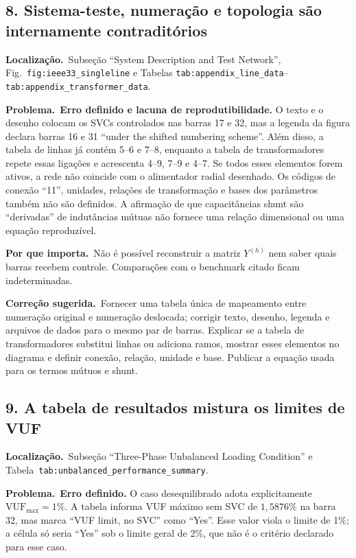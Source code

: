 \documentclass[11pt,a4paper]{article}
\newcommand{\localizacao}{\textbf{Localização.}\ }
\newcommand{\problema}{\textbf{Problema.}\ }
\newcommand{\impacto}{\textbf{Por que importa.}\ }
\newcommand{\correcao}{\textbf{Correção sugerida.}\ }
\begin{document}
\subsection*{8. Sistema-teste, numeração e topologia são internamente contraditórios}

\localizacao Subseção ``System Description and Test Network'',
Fig.~\texttt{fig:ieee33\_singleline} e Tabelas
\texttt{tab:appendix\_line\_data}--\texttt{tab:appendix\_transformer\_data}.

\problema \textbf{Erro definido e lacuna de reprodutibilidade.} O texto e o
desenho colocam os SVCs controlados nas barras 17 e 32, mas a legenda da figura
declara barras 16 e 31 ``under the shifted numbering scheme''. Além disso, a
tabela de linhas já contém 5--6 e 7--8, enquanto a tabela de transformadores
repete essas ligações e acrescenta 4--9, 7--9 e 4--7. Se todos esses elementos
forem ativos, a rede não coincide com o alimentador radial desenhado. Os códigos
de conexão ``11'', unidades, relações de transformação e bases dos parâmetros
também não são definidos. A afirmação de que capacitâncias shunt são
``derivadas'' de indutâncias mútuas não fornece uma relação dimensional ou uma
equação reproduzível.

\impacto Não é possível reconstruir a matriz $Y^{(h)}$ nem saber quais barras
recebem controle. Comparações com o benchmark citado ficam indeterminadas.

\correcao Fornecer uma tabela única de mapeamento entre numeração original e
numeração deslocada; corrigir texto, desenho, legenda e arquivos de dados para
o mesmo par de barras. Explicar se a tabela de transformadores substitui linhas
ou adiciona ramos, mostrar esses elementos no diagrama e definir conexão,
relação, unidade e base. Publicar a equação usada para os termos mútuos e shunt.

\subsection*{9. A tabela de resultados mistura os limites de VUF}

\localizacao Subseção ``Three-Phase Unbalanced Loading Condition'' e
Tabela~\texttt{tab:unbalanced\_performance\_summary}.

\problema \textbf{Erro definido.} O caso desequilibrado adota explicitamente
$\mathrm{VUF}_{\max}=1\%$. A tabela informa VUF máximo sem SVC de
$1{,}5876\%$ na barra 32, mas marca ``VUF limit, no SVC'' como ``Yes''. Esse
valor viola o limite de 1\%; a célula só seria ``Yes'' sob o limite geral de
2\%, que não é o critério declarado para esse caso.
\end{document}
